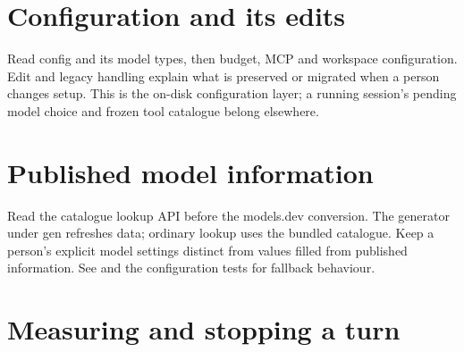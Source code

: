 


\chapter{Configuration and its edits}

Read config and its model types, then budget, MCP and workspace configuration. Edit and legacy handling explain what is preserved or migrated when a person changes setup. This is the on-disk configuration layer; a running session's pending model choice and frozen tool catalogue belong elsewhere.










\chapter{Published model information}

Read the catalogue lookup API before the models.dev conversion. The generator under gen refreshes data; ordinary lookup uses the bundled catalogue. Keep a person's explicit model settings distinct from values filled from published information. See  and the configuration tests for fallback behaviour.




\chapter{Measuring and stopping a turn}

